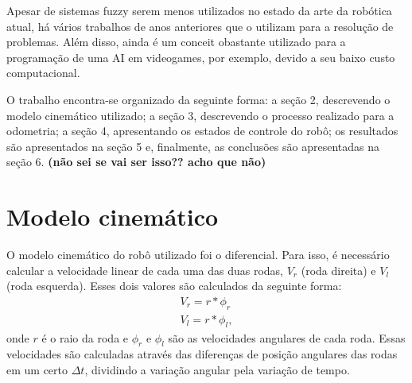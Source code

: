 \documentclass[twoside,conference,a4paper]{IEEEtran}
\begin{document}
Apesar de sistemas fuzzy serem menos utilizados no estado da arte da robótica atual, há vários trabalhos de anos anteriores que o utilizam para a resolução de problemas. Além disso, ainda é um conceit obastante utilizado para a programação de uma AI em videogames, por exemplo, devido a seu baixo custo computacional.

O trabalho encontra-se organizado da seguinte forma: a seção 2, descrevendo o modelo cinemático utilizado; a seção 3, descrevendo o processo realizado para a odometria; a seção 4, apresentando os estados de controle do robô; os resultados são apresentados na seção 5 e, finalmente, as conclusões são apresentadas na seção 6. \textbf{(não sei se vai ser isso?? acho que não)}




\section{Modelo cinemático}

O modelo cinemático do robô utilizado foi o diferencial. Para isso, é necessário calcular a velocidade linear de cada uma das duas rodas, $V_{r}$ (roda direita) e $V_{l}$ (roda esquerda). Esses dois valores são calculados da seguinte forma:
\begin{gather*}
V_{r} = r * \phi_{r} \\
V_{l} = r * \phi_{l},
\end{gather*}
onde $r$ é o raio da roda e $\phi_{r}$ e $\phi_{l}$ são as velocidades angulares de cada roda. Essas velocidades são calculadas através das diferenças de posição angulares das rodas em um certo $\Delta t$, dividindo a variação angular pela variação de tempo.
\end{document}
